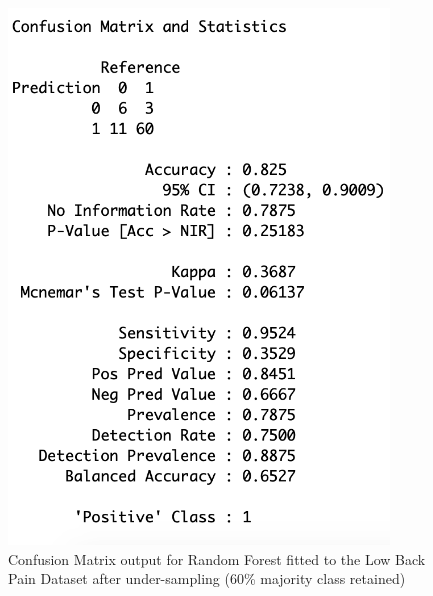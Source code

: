 \begin{figure}[!htbp]
    \centering
    \begin{minipage}{0.45\textwidth}
        \centering
        \includegraphics[width=0.9\textwidth]{ThesisTemplate/appendix/images/Chapter5Appendix/ConfusionMatrix60/LBP.png}
        \caption{Confusion Matrix output for Random Forest fitted to the Low Back Pain Dataset after under-sampling (60\% majority class retained)}
        \label{fig:matrixLBP60}
    \end{minipage}\hfill
    \begin{minipage}{0.45\textwidth}
        \centering

\end{minipage}
\end{figure}
